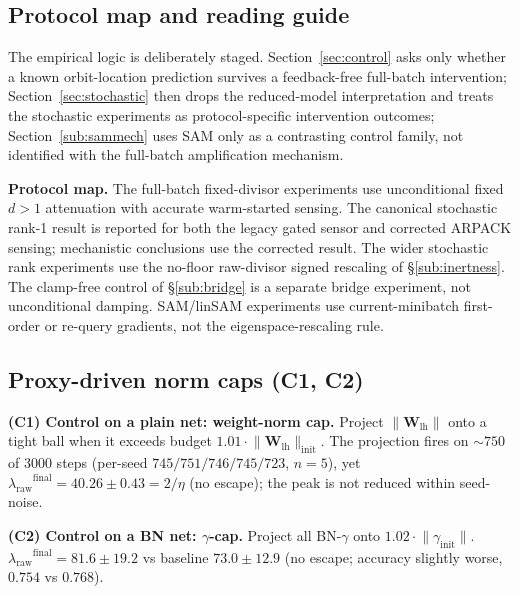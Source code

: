 \documentclass{article}
\theoremstyle{plain}
\theoremstyle{definition}
\theoremstyle{remark}
\newcommand{\lraw}{\ensuremath{\lambda_{\mathrm{raw}}}}
\begin{document}
\subsection{Protocol map and reading guide}
\label{app:protocolmap}
The empirical logic is deliberately staged.
Section~\ref{sec:control} asks only whether a known orbit-location
prediction survives a feedback-free full-batch intervention;
Section~\ref{sec:stochastic} then drops the reduced-model
interpretation and treats the stochastic experiments as
protocol-specific intervention outcomes; Section~\ref{sub:sammech}
uses SAM only as a contrasting control family, not identified with
the full-batch amplification mechanism.

\textbf{Protocol map.}
The full-batch fixed-divisor experiments use unconditional fixed
$d{>}1$ attenuation with accurate warm-started sensing. The canonical
stochastic rank-1 result is reported for both the legacy gated
sensor and corrected ARPACK sensing; mechanistic conclusions use the
corrected result. The wider stochastic rank experiments use the
no-floor raw-divisor signed rescaling of \S\ref{sub:inertness}. The
clamp-free control of \S\ref{sub:bridge} is a separate bridge
experiment, not unconditional damping. SAM/linSAM experiments use
current-minibatch first-order or re-query gradients, not the
eigenspace-rescaling rule.

\subsection{Proxy-driven norm caps (C1, C2)}
\label{app:normcaps}
\textbf{(C1) Control on a plain net: weight-norm cap.} Project
$\|\mathbf{W}_{\mathrm{lh}}\|$ onto a tight ball when it exceeds budget
$1.01\!\cdot\!\|\mathbf{W}_{\mathrm{lh}}\|_{\mathrm{init}}$. The projection fires
on $\sim\!750$ of $3000$ steps (per-seed $745/751/746/745/723$, $n\!=\!5$), yet
$\lraw^{\mathrm{final}}=40.26\!\pm\!0.43=2/\eta$ (no escape); the peak is not
reduced within seed-noise.

\textbf{(C2) Control on a BN net: $\gamma$-cap.} Project all BN-$\gamma$ onto
$1.02\!\cdot\!\|\gamma_{\mathrm{init}}\|$. $\lraw^{\mathrm{final}}=81.6\!\pm\!19.2$
vs baseline $73.0\!\pm\!12.9$ (no escape; accuracy slightly worse, $0.754$ vs
$0.768$).
\end{document}
